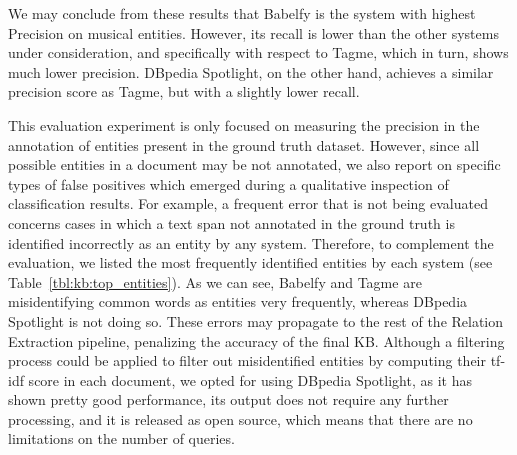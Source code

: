 We may conclude from these results that Babelfy is the system with highest Precision on musical entities. However, its recall is lower than the other systems under consideration, and specifically with respect to Tagme, which in turn, shows much lower precision. DBpedia Spotlight, on the other hand, achieves a similar precision score as Tagme, but with a slightly lower recall. 

This evaluation experiment is only focused on measuring the precision in the annotation of entities present in the ground truth dataset. However, since all possible entities in a document may be not annotated, we also report on specific types of false positives which emerged during a qualitative inspection of classification results. For example, a frequent error that is not being evaluated concerns cases in which a text span not annotated in the ground truth is identified incorrectly as an entity by any system. Therefore, to complement the evaluation, we listed the most frequently identified entities by each system (see Table~\ref{tbl:kb:top_entities}). As we can see, Babelfy and Tagme are misidentifying common words as entities very frequently, whereas DBpedia Spotlight is not doing so. 
These errors may propagate to the rest of the Relation Extraction pipeline, penalizing the accuracy of the final KB.
Although a filtering process could be applied to filter out misidentified entities by computing their tf-idf score in each document, we opted for using DBpedia Spotlight, as it has shown pretty good performance, its output does not require any further processing, and it is released as open source, which means that there are no limitations on the number of queries.


